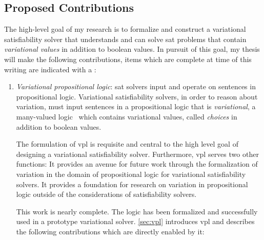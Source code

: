 \subsection{Proposed Contributions}%
\label{sec:prop-contr}
The high-level goal of my research is to formalize and construct a variational
satisfiability solver that understands and can solve \ac{sat} problems that
contain \emph{variational values} in addition to boolean values. In pursuit of
this goal, my thesis will make the following contributions, items which are
complete at time of this writing are indicated with a \checkmark:
\begin{enumerate}
\item\label{vpl-deliverable} \emph{Variational propositional logic}: \ac{sat}
  solvers input and operate on sentences in propositional
  logic\cite{10.5555/1324777}. Variational satisfiability solvers, in order to
  reason about variation, must input sentences in a propositional logic that is
  \textit{variational}, \ie{} a many-valued logic~\cite{Rescher1969-RESML} which
  contains variational values, called \emph{choices} in addition to boolean
  values.

  The formulation of \ac{vpl} is requisite and central to the high level goal of
  designing a variational satisfiability solver. Furthermore, \ac{vpl} serves
  two other functions: It provides an avenue for future work through the
  formalization of variation in the domain of propositional logic for
  variational satisfiability solvers. It provides a foundation for research on
  variation in propositional logic outside of the considerations of
  satisfiability solvers.

  This work is nearly complete. The logic has been formalized and successfully
  used in a prototype variational solver\cite{10.1145/3382025.3414965}.
  \autoref{sec:vpl} introduces \ac{vpl} and describes the following
  contributions which are directly enabled by it:


\end{enumerate}
